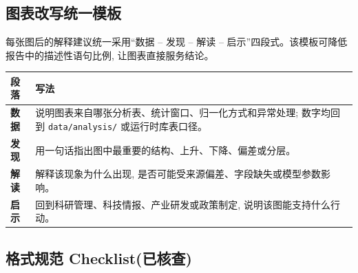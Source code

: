 \subsection{图表改写统一模板}

每张图后的解释建议统一采用“数据 -- 发现 -- 解读 -- 启示”四段式。该模板可降低报告中的描述性语句比例, 让图表直接服务结论。

\begin{center}
\begin{tabularx}{\textwidth}{>{\bfseries}p{25mm}>{\raggedright\arraybackslash}X}
\toprule
段落 & 写法 \\
\midrule
数据 & 说明图表来自哪张分析表、统计窗口、归一化方式和异常处理; 数字均回到 \texttt{data/analysis/} 或运行时库表口径。 \\
发现 & 用一句话指出图中最重要的结构、上升、下降、偏差或分层。 \\
解读 & 解释该现象为什么出现, 是否可能受来源偏差、字段缺失或模型参数影响。 \\
启示 & 回到科研管理、科技情报、产业研发或政策制定, 说明该图能支持什么行动。 \\
\bottomrule
\end{tabularx}
\end{center}

\subsection{格式规范 Checklist(已核查)}

